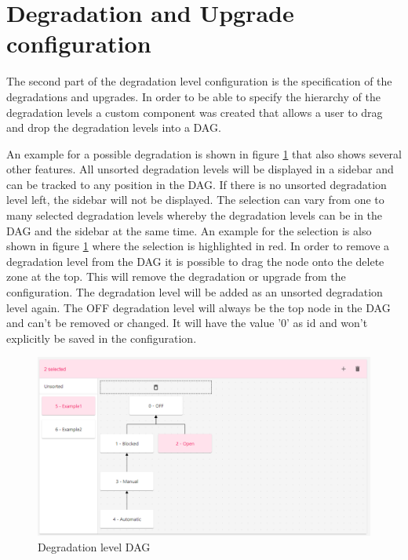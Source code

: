 \section{Degradation and Upgrade configuration}
\label{sec:deg_and_upg}

The second part of the degradation level configuration is the specification of the degradations and upgrades. In order to be able to specify the hierarchy of the degradation levels a custom component was created that allows a user to drag and drop the degradation levels into a DAG.

An example for a possible degradation is shown in figure \ref{fig:degradation_level_tree} that also shows several other features. All unsorted degradation levels will be displayed in a sidebar and can be tracked to any position in the DAG. If there is no unsorted degradation level left, the sidebar will not be displayed. The selection can vary from one to many selected degradation levels whereby the degradation levels can be in the DAG and the sidebar at the same time. An example for the selection is also shown in figure \ref{fig:degradation_level_tree} where the selection is highlighted in red. In order to remove a degradation level from the DAG it is possible to drag the node onto the delete zone at the top. This will remove the degradation or upgrade from the configuration. The degradation level will be added as an unsorted degradation level again. The OFF degradation level will always be the top node in the DAG and can't be removed or changed. It will have the value '$0$' as id and won't explicitly be saved in the configuration.

\begin{figure}[ht]
    \centering
    \includegraphics[width=\textwidth]{img/degradation_tree.png}
    \caption{Degradation level DAG}
    \label{fig:degradation_level_tree}
\end{figure}

